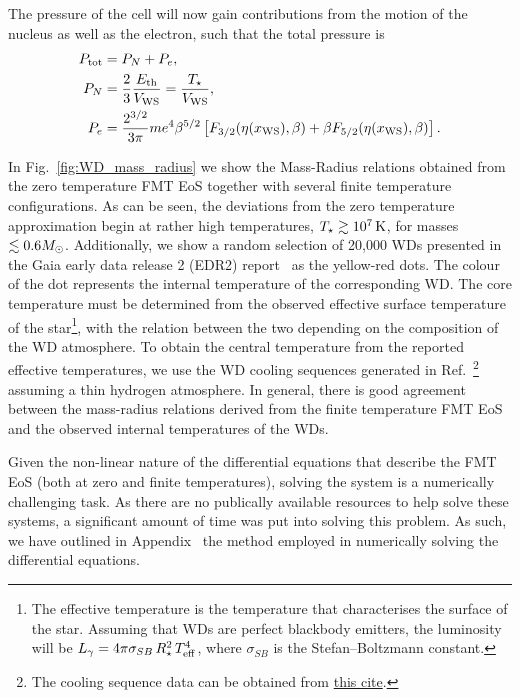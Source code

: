 The pressure of the cell will now gain contributions from the motion of the nucleus as well as the electron, such that the total pressure is
\begin{align}
    P_\mathrm{tot} & = P_N + P_e,\\
    P_N & = \frac{2}{3}\frac{E_\mathrm{th}}{V_\mathrm{WS}} = \frac{T_\star}{V_\mathrm{WS}},\\
    P_e & = \frac{2^{3/2}}{3\pi} me^4 \beta^{5/2}\left[  F_{3/2}(\eta(x_\mathrm{WS}), \beta) + \beta F_{5/2}(\eta(x_\mathrm{WS}), \beta)  \right].
\end{align}

In Fig.~\ref{fig:WD_mass_radius} we show the Mass-Radius relations obtained from the zero temperature FMT EoS together with several finite temperature configurations. As can be seen, the deviations from the zero temperature approximation begin at rather high temperatures, $T_\star\gtrsim 10^7{\rm \,K}$, for masses $\lesssim 0.6 M_\odot$. Additionally, we show a random selection of 20,000 WDs presented in the Gaia early data release 2 (EDR2) report~\cite{GentileFusillo_feb_GaiaDataRelease} as the yellow-red dots. The colour of the dot represents the internal temperature of the corresponding WD. The core temperature must be determined from the observed effective surface temperature of the star\footnote{The effective temperature is the temperature that characterises the surface of the star. Assuming that WDs are perfect blackbody emitters, the luminosity will be $L_\gamma = 4\pi \sigma_{SB} \, R_\star^2 \, T_{\rm eff}^4$, where $\sigma_{SB}$ is the Stefan–Boltzmann constant.}, with the relation between the two depending on the composition of the WD atmosphere. To obtain the central temperature from the reported effective temperatures, we use the WD cooling sequences generated in Ref.~\cite{Bedard_oct_Spectralevolutionhot}\footnote{The cooling sequence data can be obtained from \href{http://www.astro.umontreal.ca/~bergeron/CoolingModels}{this cite}.} assuming a thin hydrogen atmosphere. In general, there is good agreement between the mass-radius relations derived from the finite temperature FMT EoS and the observed internal temperatures of the WDs.

Given the non-linear nature of the differential equations that describe the FMT EoS (both at zero and finite temperatures), solving the system is a numerically challenging task. As there are no publically available resources to help solve these systems, a significant amount of time was put into solving this problem. As such, we have outlined in Appendix~ the method employed in numerically solving the differential equations. 


